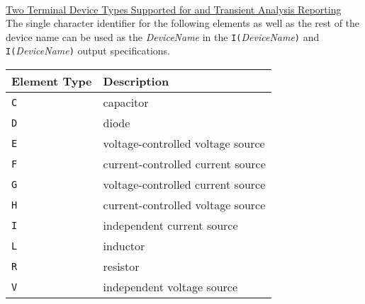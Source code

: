 \hspace*{\fill}\\[0.1in]

\noindent\underline{Two Terminal Device Types Supported for \dc
and
Transient Analysis Reporting}\\[0.1in]
The single character identifier  for the following elements as
well as the rest of the device name can be used as the {\it
DeviceName} in the {\tt I(}{\it DeviceName}{\tt )}  and {\tt
I(}{\it DeviceName}{\tt )}
output specifications.\\
\hspace*{\fill}
\begin{tabular}{|p{1in}|p{3in}|}
\hline
Element Type & Description\\
\hline
{\tt C} & capacitor\\
{\tt D} & diode\\
{\tt E} & voltage-controlled voltage source\\
{\tt F} & current-controlled current source\\
{\tt G} & voltage-controlled current source\\
{\tt H} & current-controlled voltage source\\
{\tt I} & independent current source\\
{\tt L} & inductor\\
{\tt R} & resistor\\
{\tt V} & independent voltage source\\
\hline
\end{tabular}\\[0.1in]


